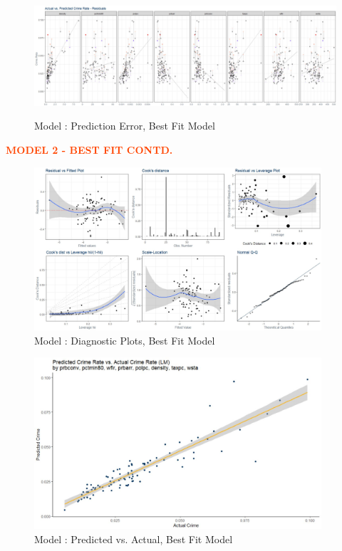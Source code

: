 \begin{figure}[!ht]
	\centering
	\includegraphics[width=1.00\textwidth]{images/Model_2_residuals.jpg}
	\label{fig:Model2 Residuals}
	\caption{Model : Prediction Error, Best Fit Model}
\end{figure}

\pagebreak

\textbf{\textcolor{OrangeRed}{MODEL 2 - BEST FIT CONTD.}}\\

\begin{figure}[!ht]
	\centering
	\includegraphics[width=0.95\textwidth]{images/Model_2_diagnostic_plots.jpg}
	\caption{Model : Diagnostic Plots, Best Fit Model}
	\label{fig:Model2 Diagnostic Plots}
\end{figure}

\begin{figure}[!ht]
	\centering
	\includegraphics[width=0.95\textwidth]{images/Model_2_performance.jpg}
	\caption{Model : Predicted vs. Actual, Best Fit Model}
	\label{fig:Model2 Performance}
\end{figure}

